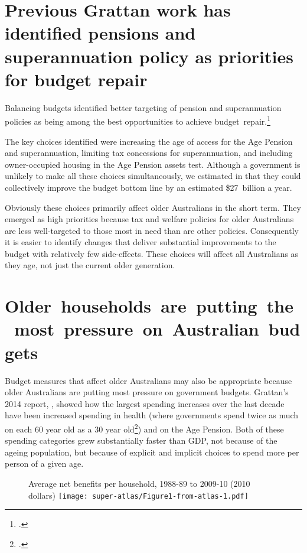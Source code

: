 \section{Previous Grattan work has identified pensions and superannuation policy as priorities for budget repair}\label{sec:SUPER-prev-grattan-work-identified-super}
Balancing budgets identified better targeting of pension and superannuation policies as being among the best opportunities to achieve budget~repair.\footcite[][29]{DaleyMcGannonSavage2013BudgetPressures}

The key choices identified were increasing the age of access for the Age Pension and superannuation, limiting tax concessions for superannuation, and including owner-occupied housing in the Age Pension assets test. Although a government is unlikely to make all these choices simultaneously, we estimated in  that they could collectively improve the budget bottom line by an estimated \$27~billion a year. 

Obviously these choices primarily affect older Australians in the short term. They emerged as high priorities because tax and welfare policies for older Australians are less well-targeted to those most in need than are other policies. Consequently it is easier to identify changes that deliver substantial improvements to the budget with relatively few side-effects. These choices will affect all Australians as they age, not just the current older generation. 

\section{\mbox{Older households are putting the most pressure on Australian budgets}}
Budget measures that affect older Australians may also be appropriate because older Australians are putting most pressure on government budgets. Grattan’s 2014 report, , showed how the largest spending increases over the last decade have been increased spending in health (where governments spend twice as much on each 60 year old as a 30 year old\footcite[][25]{DaleyMcGannonHunter2014}) and on the Age Pension. Both of these spending categories grew substantially faster than GDP, not because of the ageing population, but because of explicit and implicit choices to spend more per person of a given age.

\begin{figure}[htp]
%
{Average net benefits per household, 1988-89 to 2009-10 (2010 dollars)}\label{fig:SUPER-Wealth-of-generations-chart}
\texttt{[image: super-atlas/Figure1-from-atlas-1.pdf]}

\end{figure}

